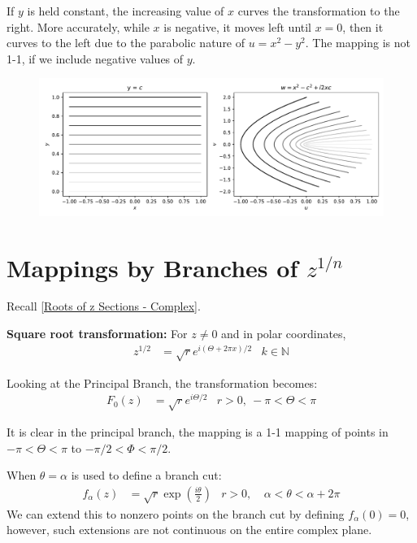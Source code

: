 \documentclass[12pt, english]{book}
\begin{document}
	If \(y\) is held constant, the increasing value of \(x\) curves the transformation to the right. More accurately, while \(x\) is negative, it moves left until \(x=0\), then it curves to the left due to the parabolic nature of \(u = x^2 - y^2\). The mapping is not 1-1, if we include negative values of \(y\).
	\begin{figure}[H]
		\centering
		\includegraphics[width=0.9\linewidth]{Python/Mapping_by_z_Squared_H}
		\caption*{}
		\label{fig:mappingbyzsquaredh}
	\end{figure}

	\section{Mappings by Branches of \texorpdfstring{\(z^{1/n}\)}{TEXT}} \label{Mappings by z Square Root Section - Complex}
	
	
	Recall \cref{Roots of z Sections - Complex}.
	
	
	\textbf{Square root transformation:} \newline
	For \(z \neq 0\) and in polar coordinates,
	\begin{align*}
		z^{1/2} &= \sqrt{r}e^{i(\Theta + 2\pi x)/2}
			& k \in \mathbb{N}
	\end{align*}
	
	Looking at the Principal Branch, the transformation becomes:
	\begin{align*}
		F_0(z) &= \sqrt{r} e^{i\Theta /2}
			& r>0, \ -\pi < \Theta < \pi
	\end{align*}
	
	It is clear in the principal branch, the mapping is a 1-1 mapping of points in \(-\pi < \Theta < \pi\) to \(-\pi/2 < \Phi < \pi/2\).
	
	When \(\theta = \alpha\) is used to define a branch cut:
	\begin{align*}
		f_\alpha(z) &= \sqrt{r} \exp(\frac{i\theta}{2})	&
			r>0,& \ \alpha < \theta < \alpha + 2\pi
	\end{align*}
	We can extend this to nonzero points on the branch cut by defining \(f_\alpha(0) = 0\), however, such extensions are not continuous on the entire complex plane.
	
\end{document}
